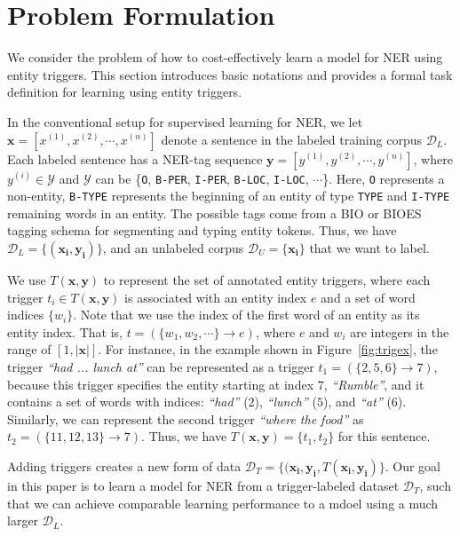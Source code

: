 \section{Problem Formulation}
\label{sec:problem}
We consider the problem of how to cost-effectively learn a model for NER using entity triggers. This section introduces basic notations and provides a formal task definition for learning using entity triggers.

In the conventional setup for supervised learning for NER, we let $\mathbf{x}=[x^{(1)}, x^{(2)}, \cdots, x^{(n)}]$ denote a sentence in the labeled training corpus $\mathcal{D}_{L}$.
Each labeled sentence has a NER-tag sequence $\textbf{y}=[y^{(1)}, y^{(2)}, \cdots, y^{(n)}]$, where $y^{(i)}\in \mathcal{Y}$ and  $\mathcal{Y}$ can be \{\texttt{O}, \texttt{B-PER}, \texttt{I-PER}, \texttt{B-LOC}, \texttt{I-LOC}, $\cdots$\}. Here, \texttt{O} represents a non-entity, \texttt{B-TYPE} represents the beginning of an entity of type \texttt{TYPE} and \texttt{I-TYPE} remaining words in an entity. The possible tags come from a BIO or BIOES tagging schema for segmenting and typing entity tokens.
Thus, we have $\mathcal{D}_{L}=\{(\mathbf{x_i}, \mathbf{y_i})\}$, and an unlabeled corpus $\mathcal{D}_{U}=\{\mathbf{x_i}\}$ that we want to label.

We use $T(\mathbf{x},\mathbf{y})$ to represent the set of annotated entity triggers, where each trigger $t_i\in T(\mathbf{x},\mathbf{y})$ is associated with an entity index $e$ and a set of word indices $\{w_i\}$.
Note that we use the index of the first word of an entity as its entity index.
That is, $t = (\{w_1, w_2, \cdots\}\rightarrow{e})$, where $e$ and $w_i$ are integers in the range of $[1,|\mathbf{x}|]$. \quad
For instance, in the example shown in Figure~\ref{fig:trigex}, the trigger \textit{``had ... lunch at''} can be represented as a trigger $t_1=(\{2,5,6\}\rightarrow{7})$, because this trigger specifies the entity starting at index $7$, \textit{``Rumble''}, and it contains a set of words with indices: \textit{``had''} ($2$), \textit{``lunch''} ($5$), and \textit{``at''} ($6$).
Similarly, we can represent the second trigger \textit{``where the food''} as $t_2 = (\{11,12,13\}\rightarrow{7})$.
Thus, we have $T(\mathbf{x},\mathbf{y})=\{t_1, t_2\}$ for this sentence.

Adding triggers creates a new form of data $\mathcal{D}_{T} = \{(\mathbf{x_i},\mathbf{y_i}, T(\mathbf{x_i},\mathbf{y_i})\}$. 
Our goal in this paper is to learn a model for NER from a trigger-labeled dataset $\mathcal{D}_T$, such that we can achieve comparable learning performance to a mdoel using a much larger $\mathcal{D}_L$.





